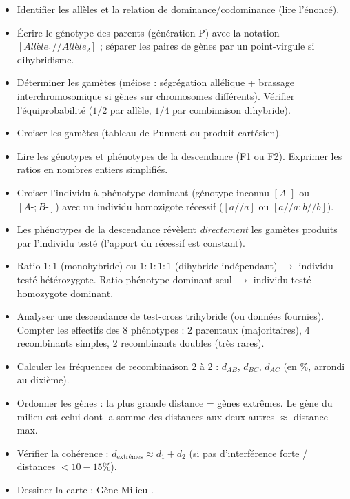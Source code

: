 \documentclass[11pt]{article}
\newcommand{\cle}[1]{{\popxbold\color{popdark}#1}}
\begin{document}
\begin{methode}
\begin{itemize}
    \item Identifier les allèles et la relation de dominance/codominance (lire l'énoncé).
    \item Écrire le génotype des parents (génération P) avec la notation $[Allèle_1//Allèle_2]$ ; séparer les paires de gènes par un point-virgule si dihybridisme.
    \item Déterminer les gamètes (méiose : ségrégation allélique + brassage interchromosomique si gènes sur chromosomes différents). Vérifier l'équiprobabilité ($1/2$ par allèle, $1/4$ par combinaison dihybride).
    \item Croiser les gamètes (tableau de Punnett ou produit cartésien).
    \item Lire les génotypes et phénotypes de la descendance (F1 ou F2). Exprimer les ratios en nombres entiers simplifiés.
\end{itemize}
\end{methode}

\begin{methode}
\begin{itemize}
    \item Croiser l'individu à phénotype dominant (génotype inconnu $[A\text{-}]$ ou $[A\text{-};B\text{-}]$) avec un individu \cle{homozigote récessif} ($[a//a]$ ou $[a//a;b//b]$).
    \item Les phénotypes de la descendance révèlent \emph{directement} les gamètes produits par l'individu testé (l'apport du récessif est constant).
    \item Ratio $1:1$ (monohybride) ou $1:1:1:1$ (dihybride indépendant) $\rightarrow$ individu testé hétérozygote. Ratio phénotype dominant seul $\rightarrow$ individu testé homozygote dominant.
\end{itemize}
\end{methode}

\begin{methode}
\begin{itemize}
    \item Analyser une descendance de test-cross trihybride (ou données fournies). Compter les effectifs des 8 phénotypes : 2 parentaux (majoritaires), 4 recombinants simples, 2 recombinants doubles (très rares).
    \item Calculer les fréquences de recombinaison 2 à 2 : $d_{AB}$, $d_{BC}$, $d_{AC}$ (en \%, arrondi au dixième).
    \item Ordonner les gènes : la plus grande distance = gènes extrêmes. Le gène du milieu est celui dont la somme des distances aux deux autres $\approx$ distance max.
    \item Vérifier la cohérence : $d_{\text{extrêmes}} \approx d_1 + d_2$ (si pas d'interférence forte / distances $< 10-15\%$).
    \item Dessiner la carte : \textendash[ $d_1$ cM ]\textendash Gène Milieu \textendash[ $d_2$ cM ]\textendash.
\end{itemize}
\end{methode}
\end{document}
